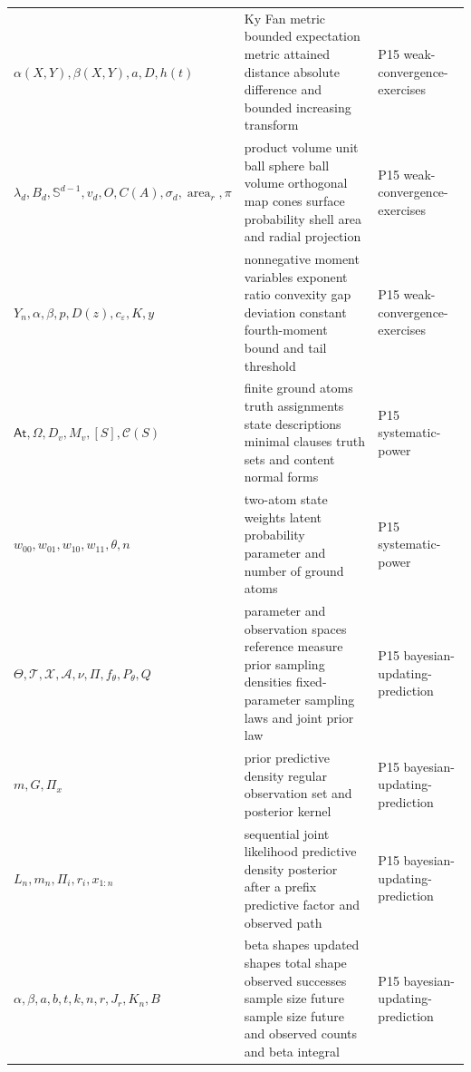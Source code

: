 \begin{longtable}{@{}p{}p{}p{}@{}}
\(\alpha(X,\allowbreak Y),\allowbreak \beta(X,\allowbreak Y),\allowbreak a,\allowbreak D,\allowbreak h(t)\) & Ky Fan metric bounded expectation metric attained distance absolute difference and bounded increasing transform & P15 weak-\allowbreak{}convergence-\allowbreak{}exercises \\
\(\lambda_d,\allowbreak B_d,\allowbreak \mathbb S^{d-1},\allowbreak v_d,\allowbreak O,\allowbreak C(A),\allowbreak \sigma_d,\allowbreak \operatorname{area}_r,\allowbreak \pi\) & product volume unit ball sphere ball volume orthogonal map cones surface probability shell area and radial projection & P15 weak-\allowbreak{}convergence-\allowbreak{}exercises \\
\(Y_n,\allowbreak \alpha,\allowbreak \beta,\allowbreak p,\allowbreak D(z),\allowbreak c_\varepsilon,\allowbreak K,\allowbreak y\) & nonnegative moment variables exponent ratio convexity gap deviation constant fourth-moment bound and tail threshold & P15 weak-\allowbreak{}convergence-\allowbreak{}exercises \\
\(\mathsf{At},\allowbreak \Omega,\allowbreak D_v,\allowbreak M_v,\allowbreak [S],\allowbreak \mathcal C(S)\) & finite ground atoms truth assignments state descriptions minimal clauses truth sets and content normal forms & P15 systematic-\allowbreak{}power \\
\(w_{00},\allowbreak w_{01},\allowbreak w_{10},\allowbreak w_{11},\allowbreak \theta,\allowbreak n\) & two-atom state weights latent probability parameter and number of ground atoms & P15 systematic-\allowbreak{}power \\
\(\Theta,\allowbreak \mathcal T,\allowbreak \mathcal X,\allowbreak \mathcal A,\allowbreak \nu,\allowbreak \Pi,\allowbreak f_\theta,\allowbreak P_\theta,\allowbreak Q\) & parameter and observation spaces reference measure prior sampling densities fixed-parameter sampling laws and joint prior law & P15 bayesian-\allowbreak{}updating-\allowbreak{}prediction \\
\(m,\allowbreak G,\allowbreak \Pi_x\) & prior predictive density regular observation set and posterior kernel & P15 bayesian-\allowbreak{}updating-\allowbreak{}prediction \\
\(L_n,\allowbreak m_n,\allowbreak \Pi_i,\allowbreak r_i,\allowbreak x_{1:n}\) & sequential joint likelihood predictive density posterior after a prefix predictive factor and observed path & P15 bayesian-\allowbreak{}updating-\allowbreak{}prediction \\
\(\alpha,\allowbreak \beta,\allowbreak a,\allowbreak b,\allowbreak t,\allowbreak k,\allowbreak n,\allowbreak r,\allowbreak J_r,\allowbreak K_n,\allowbreak B\) & beta shapes updated shapes total shape observed successes sample size future sample size future and observed counts and beta integral & P15 bayesian-\allowbreak{}updating-\allowbreak{}prediction \\

\end{longtable}
